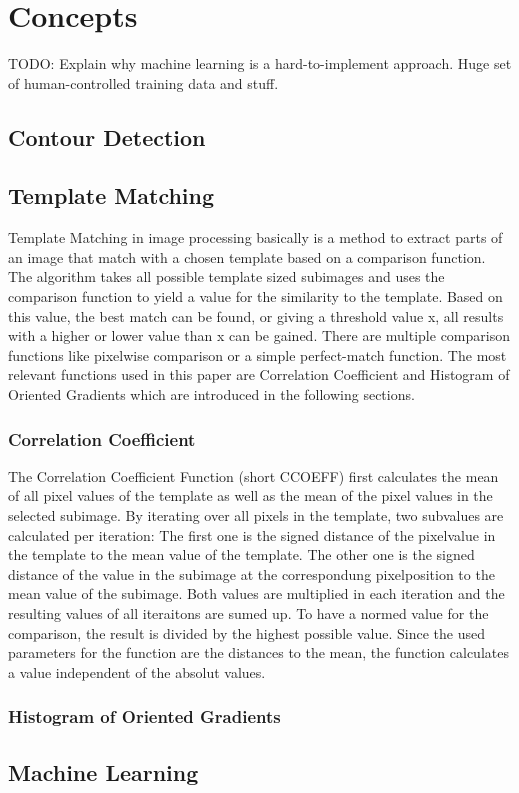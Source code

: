 \section{Concepts}
\label{sec_concepts}

TODO: Explain why machine learning is a hard-to-implement approach. Huge set of human-controlled training data and stuff.

\subsection{Contour Detection}
\subsection{Template Matching}
Template Matching in image processing basically is a method to extract parts of an image that match with a chosen template based on a comparison function.
The algorithm takes all possible template sized subimages and uses the comparison function to yield a value for the similarity to the template.
Based on this value, the best match can be found, or giving a threshold value x, all results with a higher or lower value than x can be gained.
There are multiple comparison functions like pixelwise comparison or a simple perfect-match function.
The most relevant functions used in this paper are Correlation Coefficient and Histogram of Oriented Gradients which are introduced in the following sections.

\subsubsection{Correlation Coefficient}
The Correlation Coefficient Function (short CCOEFF) first calculates the mean of all pixel values of the template as well as the mean of the pixel values in the selected subimage.
By iterating over all pixels in the template, two subvalues are calculated per iteration:
The first one is the signed distance of the pixelvalue in the template to the mean value of the template.
The other one is the signed distance of the value in the subimage at the correspondung pixelposition to the mean value of the subimage.
Both values are multiplied in each iteration and the resulting values of all iteraitons are sumed up.
To have a normed value for the comparison, the result is divided by the highest possible value.
Since the used parameters for the function are the distances to the mean, the function calculates a value independent of the absolut values. 
\subsubsection{Histogram of Oriented Gradients}

\subsection{Machine Learning}

